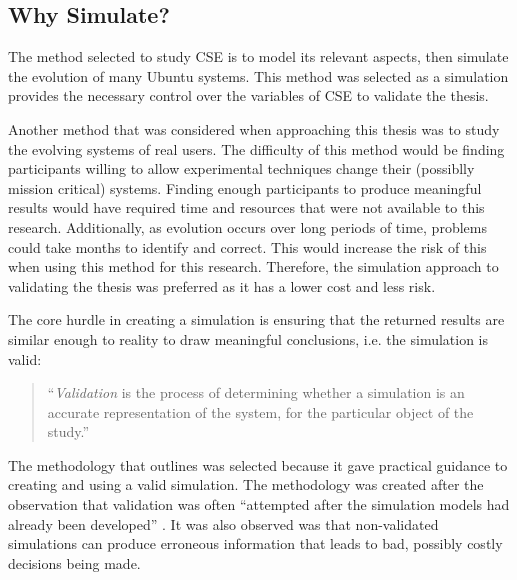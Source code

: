 \subsection{Why Simulate?}
The method selected to study CSE is to model its relevant aspects, then simulate the evolution of many Ubuntu systems.
This method was selected as a simulation provides the necessary control over the variables of CSE to validate the thesis.

Another method that was considered when approaching this thesis was to study the evolving systems of real users.
The difficulty of this method would be finding participants willing to allow experimental techniques change their (possiblly mission critical) systems.
Finding enough participants to produce meaningful results would have required time and resources that were not available to this research.
Additionally, as evolution occurs over long periods of time, problems could take months to identify and correct.
This would increase the risk of this when using this method for this research. 
Therefore, the simulation approach to validating the thesis was preferred as it has a lower cost and less risk.

The core hurdle in creating a simulation is ensuring that the returned results are similar enough to reality to draw meaningful conclusions, i.e. the simulation is valid:
\begin{quotation}
``\textit{Validation} is the process of determining whether a simulation is an accurate representation of the system, for the particular object of the study.'' \citep{Law2005}
\end{quotation}

The methodology that \cite{Law2005} outlines was selected because it gave practical guidance to creating and using a valid simulation.
The methodology was created after the observation that validation was often ``attempted after the simulation models had already been developed'' \citep{Law2005}.
It was also observed was that non-validated simulations can produce erroneous information that leads to bad, possibly costly decisions being made.

